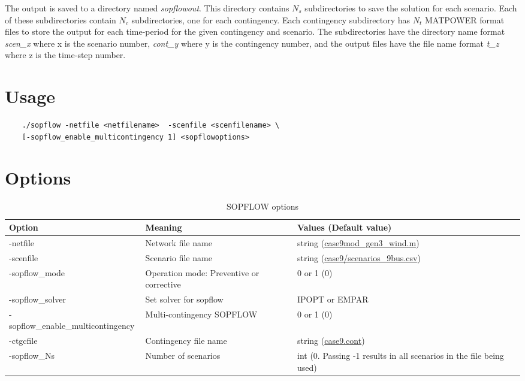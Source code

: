 The \sopflow output is saved to a directory named \emph{sopflowout}. This directory contains $N_s$ subdirectories to save the solution for each scenario. Each of these subdirectories contain $N_c$ subdirectories, one for each contingency. Each contingency subdirectory has $N_t$ MATPOWER format files to store the output for each time-period for the given contingency and scenario. The subdirectories have the directory name format \emph{scen\_x} where x is the scenario number,  \emph{cont\_y} where y is the contingency number, and the output files have the file name format \emph{t\_z} where z is the time-step number.

\section{Usage}
\begin{lstlisting}
    ./sopflow -netfile <netfilename>  -scenfile <scenfilename> \
    [-sopflow_enable_multicontingency 1] <sopflowoptions>
\end{lstlisting}

\section{Options}

\begin{table}[!htbp]
  \caption{SOPFLOW options}
  \small
  \begin{tabular}{|p{}|p{}|p{}|}
    \hline
    \textbf{Option} & \textbf{Meaning} & \textbf{Values (Default value)} \\ \hline
    -netfile & Network file name & string (\href{https://gitlab.pnnl.gov/exasgd/frameworks/exago/-/blob/master/datafiles/case9/case9mod_gen3_wind.m}{case9mod\_gen3\_wind.m}) \\ \hline
    -scenfile & Scenario file name & string (\href{https://gitlab.pnnl.gov/exasgd/frameworks/exago/-/blob/master/datafiles/case9/scenarios_9bus.csv}{case9/scenarios\_9bus.csv}) \\ \hline
    -sopflow\_mode & Operation mode: Preventive or corrective & 0 or 1 (0) \\ \hline
    -sopflow\_solver & Set solver for sopflow & IPOPT or  EMPAR \\ \hline
    -sopflow\_enable\_multicontingency & Multi-contingency SOPFLOW & 0 or 1 (0) \\ \hline \hline
    -ctgcfile & Contingency file name & string (\href{https://gitlab.pnnl.gov/exasgd/frameworks/exago/-/blob/master/datafiles/case9/case9.cont}{case9.cont}) \\ \hline
    -sopflow\_Ns & Number of scenarios & int (0. Passing -1 results in all scenarios in the file being used) \\ \hline
  \end{tabular}
  \label{tab:sopflow_options}
\end{table}

